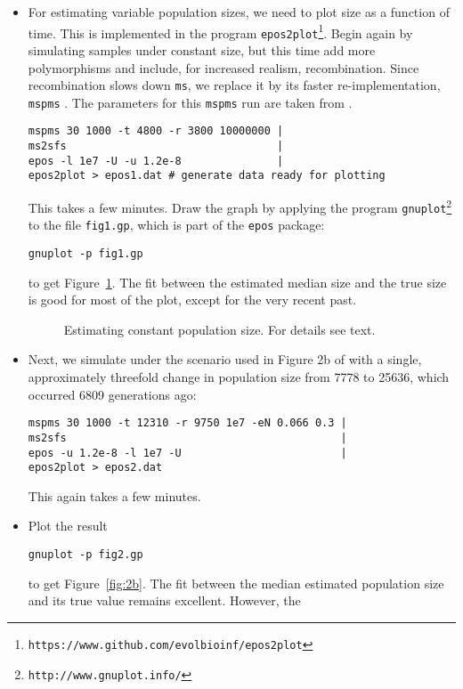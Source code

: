\documentclass[a4paper, english]{article}
\newcommand{\ty}{\texttt}
\begin{document}
\begin{itemize}
  \item For estimating variable population sizes, we need to
    plot size as a function of time. This is implemented in the
    program \ty{epos2plot}\footnote{\ty{https://www.github.com/evolbioinf/epos2plot}}. Begin again by simulating samples under constant 
    size, but this time add more polymorphisms and include, for
    increased realism, recombination. Since recombination slows down
    \ty{ms}, we replace it by its faster re-implementation, \ty{mspms}
    \citep{kel16:eff}. The parameters for this \ty{mspms} run are
    taken from \citep[Figure 2a]{liu15:exp}.
\begin{verbatim}
mspms 30 1000 -t 4800 -r 3800 10000000 |
ms2sfs                                 |
epos -l 1e7 -U -u 1.2e-8               |
epos2plot > epos1.dat # generate data ready for plotting
\end{verbatim}
This takes a few minutes. Draw the graph by applying the program
\ty{gnuplot}\footnote{\ty{http://www.gnuplot.info/}} to the file
\ty{fig1.gp}, which is part of the \ty{epos} package:
\begin{verbatim}
gnuplot -p fig1.gp
\end{verbatim}
to get Figure~\ref{fig:con}. The fit between the estimated median size
and the true size is good for most of the plot, except for the very
recent past.
\begin{figure}
  \begin{center}
    \scalebox{0.6}{}
  \end{center}
  \caption{Estimating constant population size. For details see
  text.}\label{fig:con}
\end{figure}
\item Next, we simulate under the scenario used in Figure 2b of \cite{liu15:exp}
  with a single, approximately threefold change in population size
  from 7778 to 25636, which occurred 6809 generations ago:
\begin{verbatim}
mspms 30 1000 -t 12310 -r 9750 1e7 -eN 0.066 0.3 |
ms2sfs                                           |
epos -u 1.2e-8 -l 1e7 -U                         |
epos2plot > epos2.dat
\end{verbatim}
This again takes a few minutes.
\item Plot the result
\begin{verbatim}
gnuplot -p fig2.gp
\end{verbatim}
to get Figure~\ref{fig:2b}. The fit between the median estimated
population size and its true value remains excellent. However, the

\end{itemize}
\end{document}
